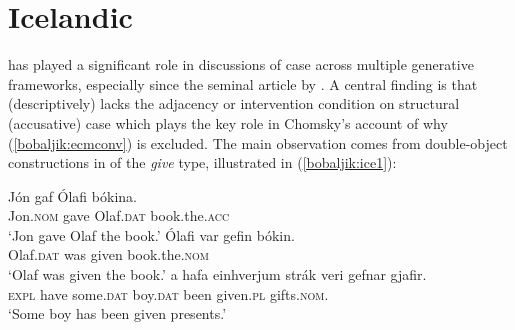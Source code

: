 \documentclass[output=paper]{langsci/langscibook}
\begin{document}
\section{Icelandic}
\largerpage[2]

 has played a significant role in discussions of case across multiple generative frameworks, especially since the seminal article by \citet{Zmt1985}. A central finding is that  (descriptively) lacks the adjacency or intervention condition on structural (accusative) case which plays the key role in Chomsky's account of why (\ref{bobaljik:ecmconv}) is excluded. The main observation comes from double-object constructions in  of the \textit{give} type, illustrated in (\ref{bobaljik:ice1}):

\begin{exe}
\ex \label{bobaljik:ice1} \begin{xlista}
\ex \label{bobaljik:bokina}  \gll J\'on gaf \'Olafi b\'okina. \\ 
Jon.{\scshape nom} gave Olaf.{\scshape dat} book.the.{\scshape acc}\\
\glt `Jon gave Olaf the book.' \citep[187]{Holmplat1995}
\ex\label{bobaljik:bokin} \gll \'Olafi var gefin b\'okin. \\
	Olaf.{\scshape dat} was given book.the.{\scshape nom} \\
\glt `Olaf was given the book.' \citep{Falk1990}
\ex\label{bobaljik:tec} \gll {\TH}a{\dh} hafa einhverjum str\'ak veri{\dh} gefnar gjafir.\\
	{\scshape expl} have some.{\scshape dat} boy.{\scshape dat} been given.{\scshape pl} gifts.{\scshape nom}. \\
\glt `Some boy has been given presents.' {\citep[99]{Holmberg2002}}	
\end{xlista}
\end{exe}
\end{document}
